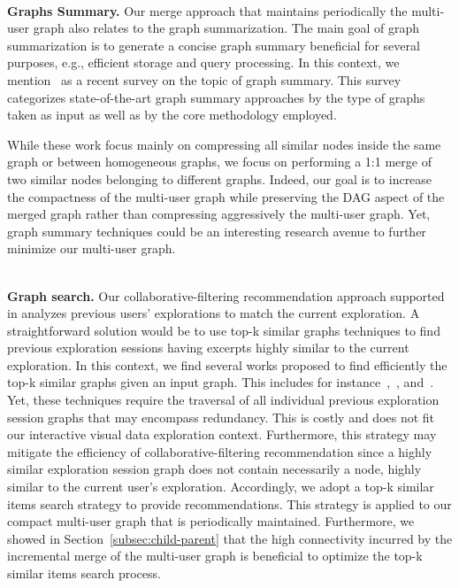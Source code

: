 ~~\\
\noindent \textbf{Graphs Summary.}  
Our merge approach that maintains periodically the multi-user graph also relates to the graph summarization.
 The main goal of graph summarization is to generate a concise graph summary beneficial for several purposes, e.g., efficient storage and query processing. 
In this context, we mention~\cite{Liu:2018:GSM} as a recent survey on the topic of graph summary. This survey 
categorizes state-of-the-art graph summary approaches by the type of graphs taken as input as well as by the core methodology employed.

 While these work focus mainly on compressing  all similar nodes inside the same graph or between homogeneous graphs, we focus on performing a 1:1 merge of two similar nodes belonging to different graphs. 
Indeed, our goal is to increase the compactness of the multi-user graph while preserving the DAG aspect of the merged graph rather than compressing aggressively the multi-user graph.  
 Yet, graph summary techniques could be an interesting research avenue to further minimize our multi-user graph.



~~\\
\noindent \textbf{Graph search.} 
Our collaborative-filtering recommendation approach supported in \prototype{} analyzes previous users' explorations to match the current exploration. A straightforward solution would be to use top-k similar graphs techniques to find previous exploration sessions having excerpts highly similar to the current exploration.
In this context, we find several works proposed to find efficiently the top-k similar graphs given an input graph.
This includes for instance~\cite{Zhu:2012},~\cite{Ranu:2014}, and~\cite{GuptaGYCH14}. Yet, these techniques require the traversal of all individual previous exploration session graphs that may encompass redundancy. This is costly and does not fit our interactive visual data exploration context. 
Furthermore, this strategy may mitigate the efficiency of collaborative-filtering recommendation since a highly similar exploration session graph does not contain necessarily a node, highly similar to the current user's exploration.
Accordingly, we adopt a top-k similar items search strategy to provide recommendations. 
This strategy is applied to our compact multi-user graph that is periodically maintained. Furthermore, we showed in Section~\ref{subsec:child-parent} that the high connectivity incurred by the incremental merge of the multi-user graph is beneficial to optimize the top-k similar items search process.


